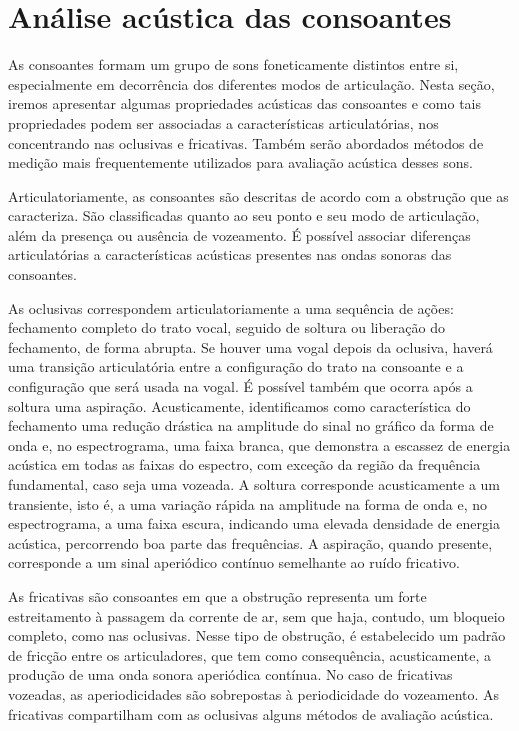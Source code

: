 \documentclass[portuguese]{textolivre}
\begin{document}
\section{Análise acústica das consoantes}\label{sec-consoantes}
As consoantes formam um grupo de sons foneticamente distintos entre si, especialmente em decorrência dos diferentes modos de articulação. Nesta seção, iremos apresentar algumas propriedades acústicas das consoantes e como tais propriedades podem ser associadas a características articulatórias, nos concentrando nas oclusivas e fricativas. Também serão abordados métodos de medição mais frequentemente utilizados para avaliação acústica desses sons.

Articulatoriamente, as consoantes são descritas de acordo com a obstrução que as caracteriza. São classificadas quanto ao seu ponto e seu modo de articulação, além da presença ou ausência de vozeamento. É possível associar diferenças articulatórias a características acústicas presentes nas ondas sonoras das consoantes. 

As oclusivas correspondem articulatoriamente a uma sequência de ações: fechamento completo do trato vocal, seguido de soltura ou liberação do fechamento, de forma abrupta. Se houver uma vogal depois da oclusiva, haverá uma transição articulatória entre a configuração do trato na consoante e a configuração que será usada na vogal. É possível também que ocorra após a soltura uma aspiração. Acusticamente, identificamos como característica do fechamento uma redução drástica na amplitude do sinal no gráfico da forma de onda e, no espectrograma, uma faixa branca, que demonstra a escassez de energia acústica em todas as faixas do espectro, com exceção da região da frequência fundamental, caso seja uma vozeada. A soltura corresponde acusticamente a um transiente, isto é, a uma variação rápida na amplitude na forma de onda e, no espectrograma, a uma faixa escura, indicando uma elevada densidade de energia acústica, percorrendo boa parte das frequências. A aspiração, quando presente, corresponde a um sinal aperiódico contínuo semelhante ao ruído fricativo.

As fricativas são consoantes em que a obstrução representa um forte estreitamento à passagem da corrente de ar, sem que haja, contudo, um bloqueio completo, como nas oclusivas. Nesse tipo de obstrução, é estabelecido um padrão de fricção entre os articuladores, que tem como consequência, acusticamente, a produção de uma onda sonora aperiódica contínua. No caso de fricativas vozeadas, as aperiodicidades são sobrepostas à periodicidade do vozeamento. As fricativas compartilham com as oclusivas alguns métodos de avaliação acústica. 
\end{document}
